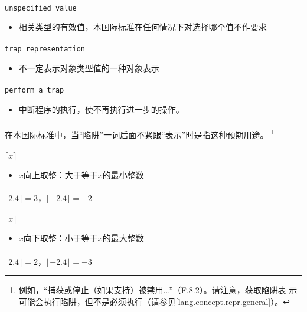 \paragraph{}
\texttt{unspecified value}
\begin{itemize}
  \item[]{相关类型的有效值，本国际标准在任何情况下对选择哪个值不作要求}
\end{itemize}

\paragraph{}
\texttt{trap representation}
\begin{itemize}
  \item[]{不一定表示对象类型值的一种对象表示}
\end{itemize}

\paragraph{}
\texttt{perform a trap}
\begin{itemize}
  \item[]{中断程序的执行，使不再执行进一步的操作。}
\end{itemize}

\paragraph{}
\notes* 在本国际标准中，当``陷阱''一词后面不紧跟``表示''时是指这种预期用途。
\footnote{例如，``捕获或停止（如果支持）被禁用...''（F.8.2）。请注意，获取陷阱表
示可能会执行陷阱，但不是必须执行（请参见\ref{lang.concept.repr.general}）。}

\paragraph{}
\texttt{$\lceil x\rceil$}
\begin{itemize}
  \item[]{$x$向上取整：大于等于$x$的最小整数}
\end{itemize}

\paragraph{}
\ex* $\lceil 2.4 \rceil = 3$，$\lceil -2.4 \rceil = -2$

\paragraph{}
\texttt{$\lfloor x\rfloor$}
\begin{itemize}
  \item[]{$x$向下取整：小于等于$x$的最大整数}
\end{itemize}

\paragraph{}
\ex* $\lfloor 2.4 \rfloor = 2$，$\lfloor -2.4 \rfloor = -3$

